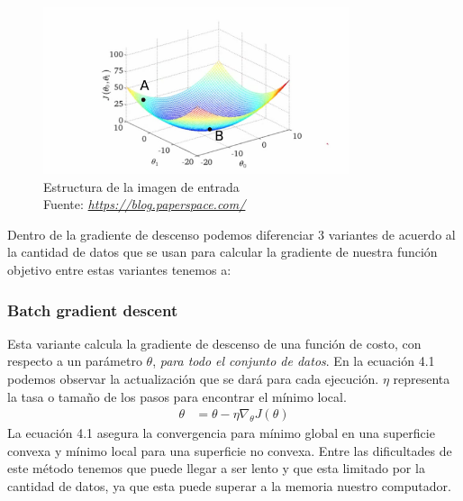 \begin{figure}[H]
	\centering
	\includegraphics[width=0.8\textwidth]{Figures/gd.png}
 	\caption{Estructura de la imagen de entrada \\ Fuente:  \href{https://blog.paperspace.com/intro-to-optimization-in-deep-learning-gradient-descent/}{\textit{https://blog.paperspace.com/}}}
	\label{image}
\end{figure}

Dentro de la gradiente de descenso podemos diferenciar 3 variantes de acuerdo al la cantidad de datos que se usan para calcular la gradiente de nuestra función objetivo entre estas variantes tenemos a:\\

\subsubsection{Batch gradient descent}
Esta variante calcula la gradiente de descenso de una función de costo, con respecto a un parámetro $\theta$, \textit{para todo el conjunto de datos}. En la ecuación 4.1 podemos observar la actualización que se dará para cada ejecución. $\eta$ representa la tasa o tamaño de los pasos para encontrar el mínimo local.
\begin{equation}
\label{bgds}
\begin{aligned}
\theta &= \theta - \eta \nabla_{\theta} J(\theta)
\end{aligned}
\end{equation}
La ecuación 4.1 asegura la convergencia para mínimo global en una superficie convexa y mínimo local para una superficie no convexa. Entre las dificultades de este método tenemos que puede llegar a ser lento y que esta limitado por la cantidad de datos, ya que esta puede superar a la memoria nuestro computador.	
